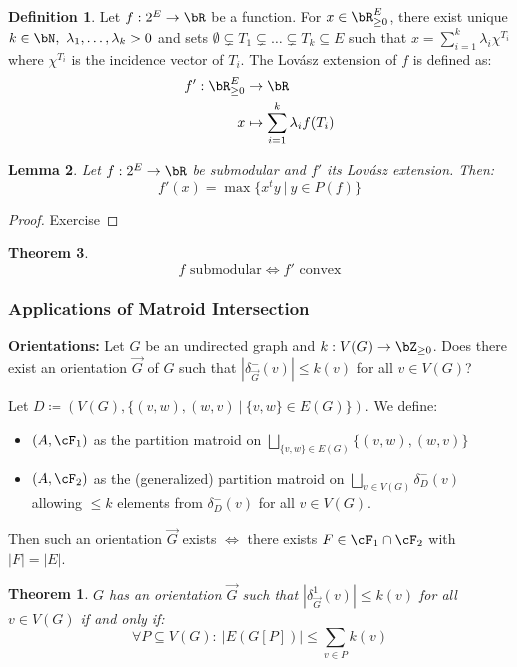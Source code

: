 \documentclass[11pt, a4paper]{article}
\newcommand{\abs}[1]{\left\lvert#1\right\rvert}
\newcommand{\set}[1]{\{#1\}}
\newtheorem{theorem}{Theorem}[section]
\newtheorem{lemma}[theorem]{Lemma}
\newtheorem*{utheorem}{Theorem}
\theoremstyle{remark}
\theoremstyle{definition}
\newtheorem{definition}[theorem]{Definition}
\begin{document}
\begin{definition}
	Let $f: 2^E\to\bR$ be a function. For $x\in \bR^E_{\geq0}$, there exist
	unique $k\in\bN,\ \lambda_1,\ldots,\lambda_k>0$ and sets
	$\emptyset\subsetneq T_1\subsetneq \ldots\subsetneq T_k\subseteq E$ such
	that $x=\sum_{i=1}^k\lambda_i \chi^{T_i}$ where $\chi^{T_i}$ is the
	incidence vector of $T_i$. The Lovász extension of $f$ is defined as:
	\begin{align*}
		f': \bR^E_{\geq0}&\to \bR \\
		x &\mapsto \sum_{i=1}^k\lambda_i f(T_i)
	\end{align*}
\end{definition}

\begin{lemma}
	Let $f: 2^E\to\bR$ be submodular and $f'$ its Lovász extension. Then:
	\[f'(x)=\max\set{x^ty\ |\ y\in P(f)}\]
\end{lemma}
\begin{proof}
	Exercise
\end{proof}

\begin{theorem}
	\[f\text{ submodular} \Leftrightarrow f'\text{ convex}\]
\end{theorem}

\subsubsection{Applications of Matroid Intersection}
\textbf{Orientations:} Let $G$ be an undirected graph and $k: V(G)\to
\bZ_{\geq0}$. Does there exist an orientation $\vec{G}$ of $G$ such that
$\abs{\delta^-_{\vec{G}}(v)}\leq k(v)$ for all $v\in V(G)$?

Let $D\coloneqq (V(G), \set{(v,w),(w,v)\ |\ \set{v,w}\in E(G)})$. We define:
\begin{itemize}
	\item $(A,\cF_1)$ as the partition matroid on $\bigsqcup_{\set{v,w}\in
	E(G)}\set{(v,w),(w,v)}$
	\item $(A,\cF_2)$ as the (generalized) partition matroid on
	$\bigsqcup_{v\in V(G)}\delta^-_D(v)$ allowing $\leq k$ elements from
	$\delta^-_D(v)$ for all $v\in V(G)$.
\end{itemize}
Then such an orientation $\vec{G}$ exists $\Leftrightarrow$ there exists
$F\in\cF_1\cap \cF_2$ with $\abs{F}=\abs{E}$.

\begin{utheorem}
	$G$ has an orientation $\vec{G}$ such that $\abs{\delta^1_{\vec{G}}(v)}
	\leq k(v)$ for all $v\in V(G)$ if and only if:
	\[\forall P\subseteq V(G):\ \abs{E(G[P])}\leq \sum_{v\in P}k(v)\]
\end{utheorem}
\end{document}
